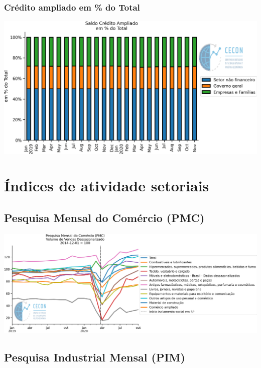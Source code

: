 \documentclass{SelfArx}
\begin{document}
\subsubsection*{Crédito ampliado em \% do Total}
\label{sec:orgc012037}

\begin{center}
\includegraphics[width=.9\linewidth]{./figs/Credito/SaldoCreditoAmpliado_Total.png}
\end{center}



\section*{Índices de atividade setoriais}
\label{sec:orga9a6366}


\subsection*{Pesquisa Mensal do Comércio (PMC)}
\label{sec:org90bc738}

\begin{center}
\includegraphics[width=.9\linewidth]{./figs/Setoriais/PMC_IBGE.png}
\end{center}


\subsection*{Pesquisa Industrial Mensal (PIM)}
\label{sec:org85959c4}
\end{document}
